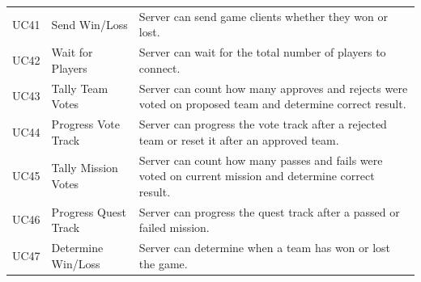 \documentclass{hitec}
\begin{document}
\begin{longtable}{l|l| p{6cm}}
UC41          & Send Win/Loss                 & Server can send game clients whether they won or lost.                                                   \\
UC42          & Wait for Players              & Server can wait for the total number of players to connect.                                              \\
UC43          & Tally Team Votes              & Server can count how many approves and rejects were voted on proposed team and determine correct result. \\
UC44          & Progress Vote Track           & Server can progress the vote track after a rejected team or reset it after an approved team.             \\
UC45          & Tally Mission Votes           & Server can count how many passes and fails were voted on current mission and determine correct result.   \\
UC46          & Progress Quest Track          & Server can progress the quest track after a passed or failed mission.                                    \\
UC47          & Determine Win/Loss            & Server can determine when a team has won or lost the game.                                              
\end{longtable}
\end{document}
